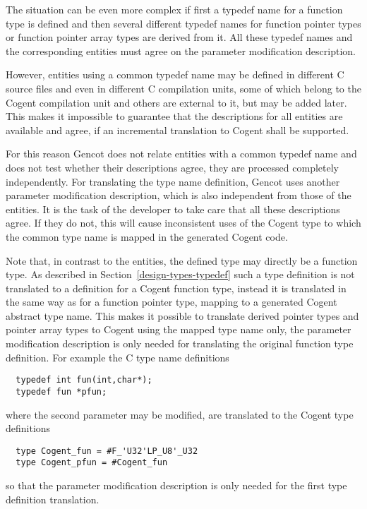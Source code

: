 The situation can be even more complex if first a typedef name for a function type is defined and then several
different typedef names for function pointer types or function pointer array types are derived from it. All
these typedef names and the corresponding entities must agree on the parameter modification description.

However, entities using a common typedef name may be defined in different C source files and even in different
C compilation units, some of which belong to the Cogent compilation unit and others are external to it, but may
be added later. This makes it impossible to guarantee that the descriptions for all entities are available
and agree, if an incremental translation to Cogent shall be supported.

For this reason Gencot does not relate entities with a common typedef name and does not test whether their
descriptions agree, they are processed completely independently. For translating the type name definition,
Gencot uses another parameter modification description, which is also independent from those of the entities.
It is the task of the developer to take care that all these descriptions agree. If they do not, this will 
cause inconsistent uses of the Cogent type to which the common type name is mapped in the generated Cogent code.

Note that, in contrast to the entities, the defined type may directly be a function type. As described in 
Section~\ref{design-types-typedef} such a type definition is not translated to a definition for a Cogent function
type, instead it is translated in the same way as for a function pointer type, mapping to a generated Cogent
abstract type name. This makes it possible to translate derived pointer types and pointer array types to 
Cogent using the mapped type name only, the parameter modification description is only needed for translating
the original function type definition. For example the C type name definitions
\begin{verbatim}
  typedef int fun(int,char*);
  typedef fun *pfun;
\end{verbatim}
where the second parameter may be modified, are translated to the Cogent type definitions
\begin{verbatim}
  type Cogent_fun = #F_'U32'LP_U8'_U32
  type Cogent_pfun = #Cogent_fun
\end{verbatim}
so that the parameter modification description is only needed for the first type definition translation.

